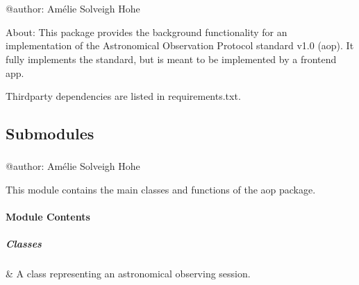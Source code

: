 \documentclass[letterpaper,10pt,english]{sphinxmanual}
\begin{document}
\sphinxstepscope


\section{}
\label{\detokenize{autoapi/aop/index:module-aop}}\label{\detokenize{autoapi/aop/index:aop}}\label{\detokenize{autoapi/aop/index::doc}}
\sphinxAtStartPar
@author: Amélie Solveigh Hohe

\sphinxAtStartPar
About: This package provides the background functionality for an implementation of
the Astronomical Observation Protocol standard v1.0 (aop). It fully implements the
standard, but is meant to be implemented by a front\sphinxhyphen{}end app.

\sphinxAtStartPar
Third\sphinxhyphen{}party dependencies are listed in requirements.txt.


\subsection{Submodules}
\label{\detokenize{autoapi/aop/index:submodules}}
\sphinxstepscope


\subsubsection{}
\label{\detokenize{autoapi/aop/aop/index:module-aop.aop}}\label{\detokenize{autoapi/aop/aop/index:aop-aop}}\label{\detokenize{autoapi/aop/aop/index::doc}}
\sphinxAtStartPar
@author: Amélie Solveigh Hohe

\sphinxAtStartPar
This module contains the main classes and functions of the aop package.


\paragraph{Module Contents}
\label{\detokenize{autoapi/aop/aop/index:module-contents}}

\subparagraph{Classes}
\label{\detokenize{autoapi/aop/aop/index:classes}}

\begin{savenotes}\sphinxattablestart
\sphinxthistablewithglobalstyle
\sphinxthistablewithnovlinesstyle
\centering
\begin{tabulary}{\linewidth}[t]{}
\sphinxtoprule
\sphinxtableatstartofbodyhook
\sphinxAtStartPar
{\hyperref[\detokenize{autoapi/aop/aop/index:aop.aop.Session}]{}}
&
\sphinxAtStartPar
A class representing an astronomical observing session.
\\
\sphinxbottomrule
\end{tabulary}
\sphinxtableafterendhook\par
\sphinxattableend\end{savenotes}
\end{document}
